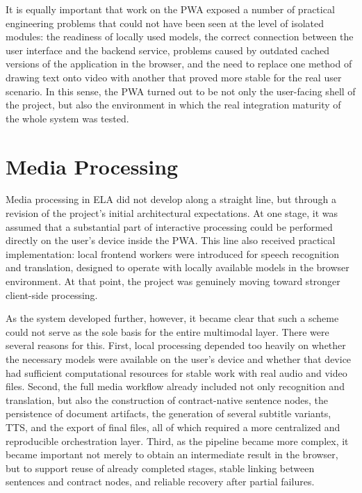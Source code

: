 \documentclass[12pt,a4paper,oneside]{report}
\begin{document}
It is equally important that work on the PWA exposed a number of practical engineering problems that could not have been seen at the level of isolated modules: the readiness of locally used models, the correct connection between the user interface and the backend service, problems caused by outdated cached versions of the application in the browser, and the need to replace one method of drawing text onto video with another that proved more stable for the real user scenario. In this sense, the PWA turned out to be not only the user-facing shell of the project, but also the environment in which the real integration maturity of the whole system was tested.

\section{Media Processing}

Media processing in ELA did not develop along a straight line, but through a revision of the project's initial architectural expectations. At one stage, it was assumed that a substantial part of interactive processing could be performed directly on the user's device inside the PWA. This line also received practical implementation: local frontend workers were introduced for speech recognition and translation, designed to operate with locally available models in the browser environment. At that point, the project was genuinely moving toward stronger client-side processing.

As the system developed further, however, it became clear that such a scheme could not serve as the sole basis for the entire multimodal layer. There were several reasons for this. First, local processing depended too heavily on whether the necessary models were available on the user's device and whether that device had sufficient computational resources for stable work with real audio and video files. Second, the full media workflow already included not only recognition and translation, but also the construction of contract-native sentence nodes, the persistence of document artifacts, the generation of several subtitle variants, TTS, and the export of final files, all of which required a more centralized and reproducible orchestration layer. Third, as the pipeline became more complex, it became important not merely to obtain an intermediate result in the browser, but to support reuse of already completed stages, stable linking between sentences and contract nodes, and reliable recovery after partial failures.
\end{document}
